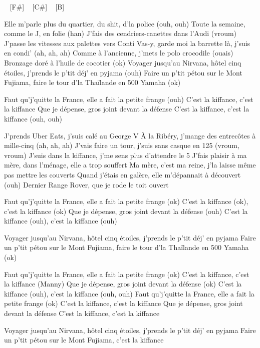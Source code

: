 
\begin{guitar}
[D#-] ~ [F#] ~ [C#] ~ [B] 

Elle m'parle plus du quartier, du shit, d'la police (ouh, ouh)
Toute la semaine, comme le J, en folie (han)
J'fais des cendriers-canettes dans l'Audi (vroum)
J'passe les vitesses aux palettes vers Conti
Vas-y, garde moi la barrette là, j'suis en condi' (ah, ah, ah)
Comme à l'ancienne, j'mets le polo crocodile (ouais)
Bronzage doré à l'huile de cocotier (ok)
Voyager jusqu'au Nirvana, hôtel cinq étoiles, j'prends le p'tit déj' en pyjama (ouh)
Faire un p'tit pétou sur le Mont Fujiama, faire le tour d'la Thaïlande en 500 Yamaha (ok)

Faut qu'j'quitte la France, elle a fait la petite frange (ouh)
C'est la kiffance, c'est la kiffance
Que je dépense, gros joint devant la défense
C'est la kiffance, c'est la kiffance (ouh, ouh)

J'prends Uber Eats, j'suis calé au George V
À la Ribéry, j'mange des entrecôtes à mille-cinq (ah, ah, ah)
J'vais faire un tour, j'suis sans casque en 125 (vroum, vroum)
J'suis dans la kiffance, j'me sens plus d'attendre le 5
J'fais plaisir à ma mère, dans l'ménage, elle a trop souffert
Ma mère, c'est ma reine, j'la laisse même pas mettre les couverts
Quand j'étais en galère, elle m'dépannait à découvert (ouh)
Dernier Range Rover, que je rode le toit ouvert

Faut qu'j'quitte la France, elle a fait la petite frange (ok)
C'est la kiffance (ok), c'est la kiffance (ok)
Que je dépense, gros joint devant la défense (ouh)
C'est la kiffance (ouh), c'est la kiffance (ouh)

Voyager jusqu'au Nirvana, hôtel cinq étoiles, j'prends le p'tit déj' en pyjama
Faire un p'tit pétou sur le Mont Fujiama, faire le tour d'la Thaïlande en 500 Yamaha (ok)

Faut qu'j'quitte la France, elle a fait la petite frange (ok)
C'est la kiffance, c'est la kiffance (Manny)
Que je dépense, gros joint devant la défense (ok)
C'est la kiffance (ouh), c'est la kiffance (ouh, ouh)
Faut qu'j'quitte la France, elle a fait la petite frange (ok)
C'est la kiffance, c'est la kiffance
Que je dépense, gros joint devant la défense
C'est la kiffance, c'est la kiffance

Voyager jusqu'au Nirvana, hôtel cinq étoiles, j'prends le p'tit déj' en pyjama
Faire un p'tit pétou sur le Mont Fujiama, c'est la kiffance
\end{guitar}